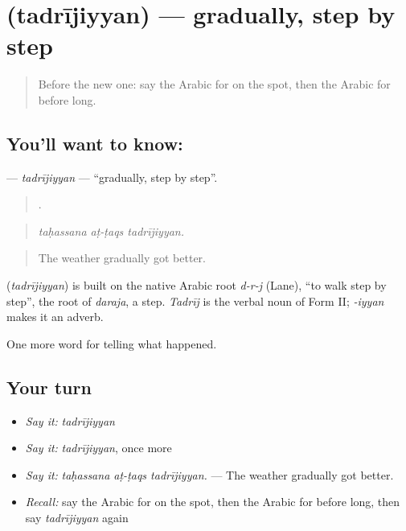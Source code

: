 \section[\texorpdfstring{\ar{تدريجيا} (tadrījiyyan)}{تدريجيا (tadrījiyyan)}]{ (tadrījiyyan) — gradually, step by step}

\label{lesson:AR-C313-tadrijiyyan}



\begin{quote}
Before the new one: say the Arabic for on the spot, then the Arabic for before long.
\end{quote}

\subsection*{You'll want to know: }
\textbf{} — \emph{tadrījiyyan} — \textquotedblleft{}gradually, step by step\textquotedblright{}.

\begin{quote}
  .
\end{quote}

\begin{quote}
\emph{taḥassana aṭ-ṭaqs tadrījiyyan.}
\end{quote}

\begin{quote}
The weather gradually got better.
\end{quote}

\begin{cousinweb}
\textbf{} (\emph{tadrījiyyan}) is built on the native Arabic root \emph{d-r-j} (Lane), \textquotedblleft{}to walk step by step\textquotedblright{}, the root of \emph{daraja}, a step. \emph{Tadrīj} is the verbal noun of Form II; \emph{-iyyan} makes it an adverb.
\end{cousinweb}

\begin{grammarlens}[title={What you've built}]
One more word for telling what happened.
\end{grammarlens}

\subsection*{Your turn}
\begin{itemize}
\raggedright
  \item \emph{Say it:} \emph{tadrījiyyan}
  \item \emph{Say it:} \emph{tadrījiyyan}, once more
  \item \emph{Say it:} \emph{taḥassana aṭ-ṭaqs tadrījiyyan.} — The weather gradually got better.
  \item \emph{Recall:} say the Arabic for on the spot, then the Arabic for before long, then say \emph{tadrījiyyan} again
\end{itemize}

